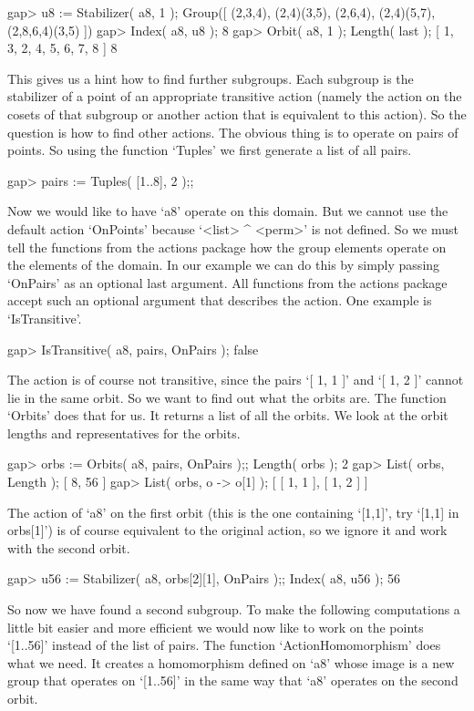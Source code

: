 \beginexample
gap> u8 := Stabilizer( a8, 1 );
Group([ (2,3,4), (2,4)(3,5), (2,6,4), (2,4)(5,7), (2,8,6,4)(3,5) ])
gap> Index( a8, u8 );
8
gap> Orbit( a8, 1 ); Length( last );
[ 1, 3, 2, 4, 5, 6, 7, 8 ]
8
\endexample

This gives us a hint how to find further  subgroups. Each subgroup is the
stabilizer of a point of an appropriate  transitive action (namely the
action  on  the cosets of that  subgroup  or another action that is
equivalent to  this action).  So the question   is how  to find  other
actions. The obvious thing is to operate  on pairs of points. So using
the function `Tuples' we first generate a list of all pairs.

\beginexample
gap> pairs := Tuples( [1..8], 2 );;
\endexample

Now we would like to have `a8' operate on this  domain. But we cannot use
the  default action `OnPoints'  because    `<list> ^ <perm>' is    not
defined. So we  must tell the functions  from the actions package  how
the group elements operate on the elements of  the domain. In our example
we can do this by simply passing `OnPairs' as an optional last argument.
All functions from the actions package accept such an optional argument
that describes the action. One example is `IsTransitive'.

\beginexample
gap> IsTransitive( a8, pairs, OnPairs );
false
\endexample

The action is of course not transitive, since the pairs `[ 1, 1 ]' and
`[ 1, 2 ]' cannot lie in the same orbit.
So we want to  find out what the orbits are.
The function `Orbits' does that for us.
It returns a list of all the orbits.
We look at the orbit lengths and representatives for the orbits.

\beginexample
gap> orbs := Orbits( a8, pairs, OnPairs );; Length( orbs );
2
gap> List( orbs, Length );
[ 8, 56 ]
gap> List( orbs, o -> o[1] );
[ [ 1, 1 ], [ 1, 2 ] ]
\endexample

The action of `a8'   on the first  orbit (this  is the one  containing
`[1,1]', try `[1,1] in orbs[1]') is of  course equivalent to the original
action, so we ignore it and work with the second orbit.

\beginexample
gap> u56 := Stabilizer( a8, orbs[2][1], OnPairs );; Index( a8, u56 );
56
\endexample

So   now   we have  found   a  second subgroup.   To   make the following
computations a little bit easier and more efficient  we would now like to
work on the points `[1..56]'  instead of the list  of pairs. The function
`ActionHomomorphism' does what  we need.   It creates a   homomorphism
defined on `a8' whose image is a new group  that operates on `[1..56]' in
the same way that `a8' operates on the second orbit.

